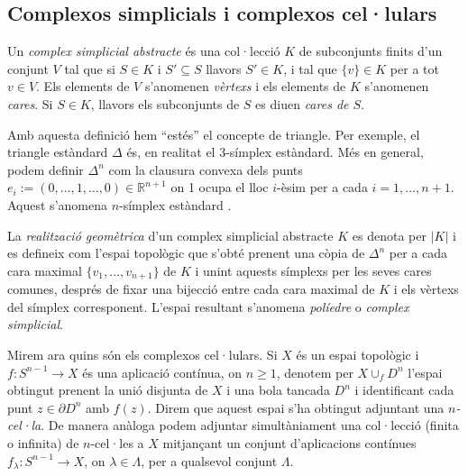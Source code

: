 \documentclass[../main.tex]{subfiles}
\begin{document}
\subsection{Complexos simplicials i complexos cel·lulars}
\begin{defi}
\label{def:complexsimplicialabstracte} Un \textit{complex simplicial abstracte} és una col·lecció $K$ de subconjunts finits d'un conjunt $V$ tal que si $S\in K$ i $S'\subseteq S$ llavors $S'\in K$, i tal que $\{v\}\in K$ per a tot $v\in V$. Els elements de $V$ s'anomenen \textit{vèrtexs} i els elements de $K$ s'anomenen \textit{cares}. Si $S\in K$, llavors els subconjunts de $S$ es diuen \textit{cares de $S$}.
\end{defi}

Amb aquesta definició hem ``estés'' el concepte de triangle. Per exemple, el triangle estàndard $\Delta$ és, en realitat el 3-símplex estàndard. Més en general, podem definir $\Delta^n$ com la clausura convexa dels punts $e_i:=(0,\ldots,1,\ldots,0)\in \mathbb{R}^{n+1}$ on 1 ocupa el lloc $i$-èsim per a cada $i=1,\ldots,n+1$. Aquest s'anomena $n$-símplex estàndard .

\begin{defi}
\label{def:realitzaciogeometrica} La \textit{realització geomètrica} d'un complex simplicial abstracte $K$ es denota per $|K|$ i es defineix com l'espai topològic que s'obté prenent una còpia de $\Delta^n$ per a cada cara maximal $\{v_1,\ldots,v_{n+1}\}$ de $K$ i unint aquests símplexs per les seves cares comunes, després de fixar una bijecció entre cada cara maximal de $K$ i els vèrtexs del símplex corresponent. L'espai resultant s'anomena \textit{políedre} o \textit{complex simplicial}.
\end{defi}

Mirem ara quins són els complexos cel·lulars. Si $X$ és un espai topològic i $f:S^{n-1}\rightarrow X$ és una aplicació contínua, on $n\geq 1$, denotem per $X\cup_f D^n$ l'espai obtingut prenent la unió disjunta de $X$ i una bola tancada $D^n$ i identificant cada punt $z\in\partial D^n$ amb $f(z)$. Direm que aquest espai s'ha obtingut adjuntant una \textit{$n$-cel·la}\label{def:ncella}. De manera anàloga podem adjuntar simultàniament una col·lecció (finita o infinita) de $n$-cel·les a $X$ mitjançant un conjunt d'aplicacions contínues $f_\lambda:S^{n-1}\rightarrow X$, on $\lambda\in \Lambda$, per a qualsevol conjunt $\Lambda$.
\end{document}
